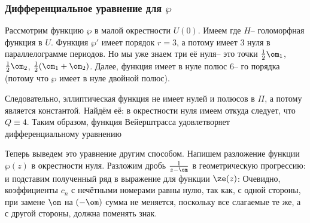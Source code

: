 \documentclass[a4paper]{article}
\begin{document}
\subsubsection{Дифференциальное уравнение для $\wp$}

Рассмотрим функцию $\wp$ в малой окрестности $U(0)$. Имеем
где $H$-- голоморфная функция в $U$.
Функция $\wp'$ имеет порядок $r =3$, а потому имеет $3$ нуля в параллелограмме периодов.
Но мы уже знаем три её нуля-- это точки $\frac12\om_1$, $\frac12\om_2$, $\frac12(\om_1+\om_2)$.
Далее, функция
имеет в нуле полюс $6$-- го порядка (потому что $\wp$ имеет в нуле двойной полюс).

Следовательно, эллиптическая функция
не имеет нулей и полюсов в $\Pi$, а потому является константой.
Найдём её: в окрестности нуля имеем
откуда следует, что $Q \equiv 4$. Таким образом, функция Вейерштрасса удовлетворяет
дифференциальному уравнению

\medskip

Теперь выведем это уравнение другим способом.
Напишем разложение функции $\wp(z)$ в окрестности нуля. Разложим дробь $\frac{1}{z-\om}$
в геометрическую прогрессию:
и подставим полученный ряд в выражение для функции $\ze(z)$:
Очевидно, коэффициенты $c_n$ с нечётными номерами равны нулю, так как, с одной стороны,
при замене $\om$ на $(-\om)$ сумма не меняется, поскольку все слагаемые те же,
а с другой стороны, должна поменять знак.
\end{document}
